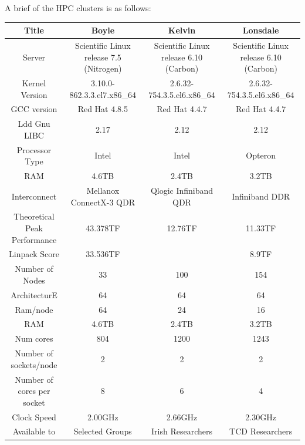 A brief of the HPC clusters\cite{TCHPC_clusters} is as follows: 

\begin{center}
	\begin{landscape}
	\begin{longtable}{||c c c c||}
		\hline
		Title & Boyle & Kelvin & Lonsdale \\ [0.5ex] 
		\hline\hline
		Server & Scientific Linux release 7.5 (Nitrogen) & Scientific Linux release 6.10 (Carbon) & Scientific Linux release 6.10 (Carbon) \\ 
		\hline
		Kernel Version & 3.10.0-862.3.3.el7.x86{\_}64 & 2.6.32-754.3.5.el6.x86{\_}64 & 2.6.32-754.3.5.el6.x86{\_}64 \\
		\hline
		GCC version & Red Hat 4.8.5 & Red Hat 4.4.7 & Red Hat 4.4.7 \\
		\hline
		Ldd Gnu LIBC & 2.17 & 2.12 & 2.12 \\
		\hline
		Processor Type & Intel & Intel & Opteron \\ 
		\hline
		RAM & 4.6TB & 2.4TB & 3.2TB \\
		\hline
		Interconnect & Mellanox ConnectX-3 QDR & Qlogic Infiniband QDR & Infiniband DDR \\
		\hline
		Theoretical Peak Performance & 43.378TF & 12.76TF & 11.33TF \\
		\hline
		Linpack Score & 33.536TF &   & 8.9TF \\
		\hline
		Number of Nodes & 33 & 100 & 154 \\
		\hline
		ArchitecturE & 64 & 64 & 64 \\
		\hline
		Ram/node & 64 & 24 & 16 \\
		\hline
		RAM & 4.6TB & 2.4TB & 3.2TB \\
		\hline
		Num cores & 804 & 1200 & 1243 \\
		\hline
		Number of sockets/node & 2 & 2 & 2 \\
		\hline
		Number of cores per socket & 8 & 6 & 4 \\
		\hline
		Clock Speed & 2.00GHz & 2.66GHz & 2.30GHz \\
		\hline
		Available to & Selected Groups & Irish Researchers & TCD Researchers \\ [1ex] 
		\hline
	\end{longtable}
	\end{landscape}
\end{center}

